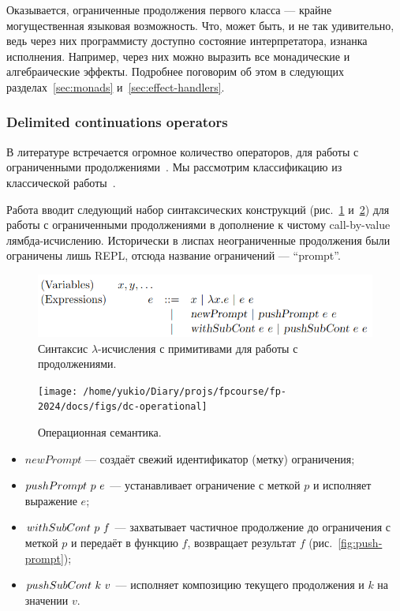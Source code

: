 Оказывается, ограниченные продолжения первого класса --- крайне могущественная языковая возможность.
Что, может быть, и не так удивительно, ведь через них программисту доступно состояние интерпретатора, изнанка исполнения.
Например, через них можно выразить все монадические и алгебраические эффекты.
Подробнее поговорим об этом в следующих разделах~\ref{sec:monads} и~\ref{sec:effect-handlers}.

\subsubsection{Delimited continuations operators}

В литературе встречается огромное количество операторов, для работы с ограниченными продолжениями~\cite[приложение А]{hillerstrom2022foundations}.
Мы рассмотрим классификацию из классической работы~\cite{dyvbig2007monadic}.

Работа вводит следующий набор синтаксических конструкций (рис.~\ref{fig:prompt-syntax} и~\ref{fig:dc-operational}) для работы с ограниченными продолжениями в дополнение к чистому call-by-value лямбда-исчислению.
Исторически в лиспах неограниченные продолжения были ограничены лишь REPL, отсюда название ограничений --- ``prompt''.

\begin{figure}[h]
    \centering
    \includegraphics[width=0.75\linewidth]{figs/prompt-syntax}
    \caption{Синтаксис $\lambda$-исчисления с примитивами для работы с продолжениями.}
    \label{fig:prompt-syntax}
\end{figure}

\begin{figure}
    \centering
    \texttt{[image: /home/yukio/Diary/projs/fpcourse/fp-2024/docs/figs/dc-operational]}
    \caption{Операционная семантика.}
    \label{fig:dc-operational}
\end{figure}

\begin{itemize}
    \item $newPrompt$ --- создаёт свежий идентификатор (метку) ограничения;
    \item $pushPrompt ~ p ~ e$ --- устанавливает ограничение с меткой $p$ и исполняет выражение $e$;
    \item $withSubCont~ p~ f$ --- захватывает частичное продолжение до ограничения с меткой $p$ и передаёт в функцию $f$, возвращает результат $f$ (рис.~\ref{fig:push-prompt});
    \item $pushSubCont~ k ~ v$ --- исполняет композицию текущего продолжения и $k$ на значении $v$.
\end{itemize}

